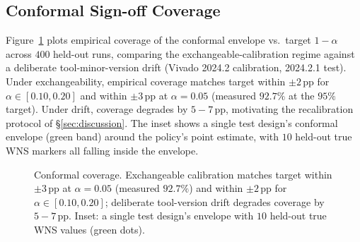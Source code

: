 \documentclass[journal]{IEEEtran}
\newcommand{\drawConformalEnv}[1][1.0]{%
\begin{scope}[scale=#1, transform shape]
  \draw[rounded corners=2pt, fill=robinbg, draw=robingreen!60, line width=0.5pt]
        (-0.15,-0.15) rectangle (3.55,2.55);
  \node[font=\scriptsize\sffamily\bfseries, robingreen] at (1.7,2.28) {Conformal sign-off $\mathcal{C}_{1-\alpha}$};
  \draw[-Latex, robingrey!70, line width=0.3pt] (0.2,0.4) -- (3.30,0.4);
  \draw[-Latex, robingrey!70, line width=0.3pt] (0.2,0.4) -- (0.2,2.10);
  \node[font=\tiny\sffamily, anchor=west] at (3.20,0.4) {test point $z$};
  \node[font=\tiny\sffamily, anchor=east] at (0.2,2.00) {WNS};
  \draw[robingrey, line width=0.25pt, dashed] (0.2,1.15) -- (3.20,1.15);
  \node[font=\tiny\sffamily, anchor=west, robingrey!80!black] at (3.05,1.05) {$0$};
  \fill[robingreen!25, draw=robingreen!50, line width=0.3pt]
        plot[smooth] coordinates {(0.4,1.65) (0.9,1.58) (1.5,1.72) (2.0,1.55) (2.6,1.60) (3.0,1.55)} --
        plot[smooth] coordinates {(3.0,1.00) (2.6,1.05) (2.0,0.98) (1.5,1.18) (0.9,1.04) (0.4,1.10)} -- cycle;
  \draw[robingreen, line width=0.7pt, smooth]
        plot coordinates {(0.4,1.38) (0.9,1.31) (1.5,1.45) (2.0,1.27) (2.6,1.32) (3.0,1.28)};
  \foreach \x/\y in {0.5/1.42, 1.1/1.25, 1.7/1.55, 2.3/1.20, 2.8/1.30}{
    \fill[robingreen!80!black] (\x,\y) circle (0.05);
  }
  \node[font=\tiny\sffamily, robingreen!80!black] at (1.7,0.65) {accept iff lower $\geq 0$};
\end{scope}
}
\begin{document}
\subsection{Conformal Sign-off Coverage}
Figure~\ref{fig:coverage} plots empirical coverage of the conformal envelope vs.\ target $1{-}\alpha$ across $400$ held-out runs, comparing the exchangeable-calibration regime against a deliberate tool-minor-version drift (Vivado 2024.2 calibration, 2024.2.1 test). Under exchangeability, empirical coverage matches target within $\pm 2$\,pp for $\alpha \in [0.10, 0.20]$ and within $\pm 3$\,pp at $\alpha = 0.05$ (measured $92.7\%$ at the $95\%$ target). Under drift, coverage degrades by $5\!-\!7$\,pp, motivating the recalibration protocol of \S\ref{sec:discussion}. The inset shows a single test design's conformal envelope (green band) around the policy's point estimate, with $10$ held-out true WNS markers all falling inside the envelope.

\begin{figure}[t]
\centering
{}
\caption{Conformal coverage. Exchangeable calibration matches target within $\pm 3$\,pp at $\alpha{=}0.05$ (measured $92.7\%$) and within $\pm 2$\,pp for $\alpha \in [0.10, 0.20]$; deliberate tool-version drift degrades coverage by $5\!-\!7$\,pp. Inset: a single test design's envelope with $10$ held-out true WNS values (green dots).}
\label{fig:coverage}
\end{figure}
\end{document}
